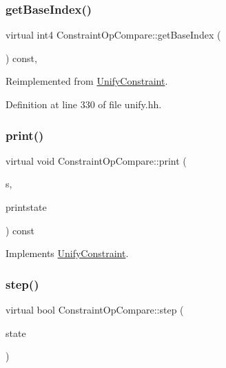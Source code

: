 \subsubsection{\texorpdfstring{getBaseIndex()}{getBaseIndex()}}
{\footnotesize\ttfamily virtual int4 Constraint\+Op\+Compare\+::get\+Base\+Index (\begin{DoxyParamCaption}\item[{void}]{ }\end{DoxyParamCaption}) const\hspace{0.3cm}{\ttfamily [inline]}, {\ttfamily [virtual]}}



Reimplemented from \mbox{\hyperlink{class_unify_constraint_a44f0164f38ac1fdc44fc73ebe7678de1}{Unify\+Constraint}}.



Definition at line 330 of file unify.\+hh.

\mbox{\label{class_constraint_op_compare_af654630346b3640959fb4504573a6466}} 
\subsubsection{\texorpdfstring{print()}{print()}}
{\footnotesize\ttfamily virtual void Constraint\+Op\+Compare\+::print (\begin{DoxyParamCaption}\item[{ostream \&}]{s,  }\item[{\mbox{\hyperlink{class_unify_c_printer}{Unify\+C\+Printer}} \&}]{printstate }\end{DoxyParamCaption}) const\hspace{0.3cm}{\ttfamily [virtual]}}



Implements \mbox{\hyperlink{class_unify_constraint_a774f6a611a96384766cb8e8d8f5ff41f}{Unify\+Constraint}}.

\mbox{\label{class_constraint_op_compare_ad3e51a4ae74aa157e112f2aa85f23781}} 
\subsubsection{\texorpdfstring{step()}{step()}}
{\footnotesize\ttfamily virtual bool Constraint\+Op\+Compare\+::step (\begin{DoxyParamCaption}\item[{\mbox{\hyperlink{class_unify_state}{Unify\+State}} \&}]{state }\end{DoxyParamCaption})\hspace{0.3cm}{\ttfamily [virtual]}}



